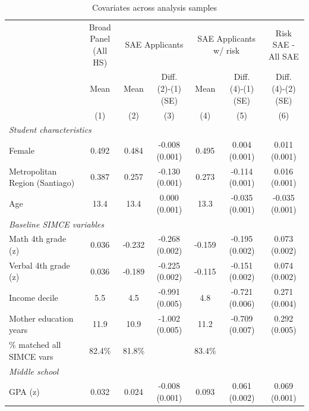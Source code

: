 \begin{table}[H]
\centering
\caption{Covariates across analysis samples}
\label{tab:balance_samples}
\scriptsize
\setlength{\tabcolsep}{2pt}
\begin{tabular}{@{}lcccccc@{}}
\toprule
 & \shortstack{Broad Panel\\(All HS)} & \multicolumn{2}{c}{SAE Applicants} & \multicolumn{2}{c}{SAE Applicants w/ risk} & \shortstack{Risk SAE -\\All SAE} \\
\cmidrule(lr){3-4} \cmidrule(lr){5-6}
 & Mean & Mean & \shortstack{Diff.\\(2)-(1)\\(SE)} & Mean & \shortstack{Diff.\\(4)-(1)\\(SE)} & \shortstack{Diff.\\(4)-(2)\\(SE)} \\
 & (1) & (2) & (3) & (4) & (5) & (6) \\
\midrule
\multicolumn{7}{l}{\textit{Student characteristics}} \\[2pt]
Female & 0.492 & 0.484 & -0.008 (0.001) & 0.495 & 0.004 (0.001) & 0.011 (0.001) \\
Metropolitan Region (Santiago) & 0.387 & 0.257 & -0.130 (0.001) & 0.273 & -0.114 (0.001) & 0.016 (0.001) \\
Age & 13.4 & 13.4 & 0.000 (0.001) & 13.3 & -0.035 (0.001) & -0.035 (0.001) \\
\midrule
\multicolumn{7}{l}{\textit{Baseline SIMCE variables}} \\[2pt]
Math 4th grade (z) & 0.036 & -0.232 & -0.268 (0.002) & -0.159 & -0.195 (0.002) & 0.073 (0.002) \\
Verbal 4th grade (z) & 0.036 & -0.189 & -0.225 (0.002) & -0.115 & -0.151 (0.002) & 0.074 (0.002) \\
Income decile & 5.5 & 4.5 & -0.991 (0.005) & 4.8 & -0.721 (0.006) & 0.271 (0.004) \\
Mother education years & 11.9 & 10.9 & -1.002 (0.005) & 11.2 & -0.709 (0.007) & 0.292 (0.005) \\
\quad\footnotesize{\% matched all SIMCE vars} & \footnotesize{82.4\%} & \footnotesize{81.8\%} &  & \footnotesize{83.4\%} &  &  \\
\midrule
\multicolumn{7}{l}{\textit{Middle school}} \\[2pt]
GPA (z) & 0.032 & 0.024 & -0.008 (0.001) & 0.093 & 0.061 (0.002) & 0.069 (0.001) \\

\end{tabular}
\end{table}
